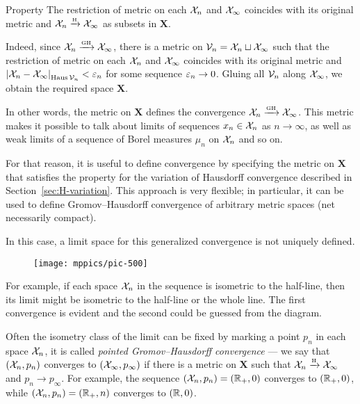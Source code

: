 \begin{thm}{Property}\label{propery:GH}
The restriction of metric on each $\mathcal{X}_n$ and $\mathcal{X}_\infty$ coincides with its original metric 
and $\mathcal{X}_n\xrightarrow{\mbox{\tiny\rm H}} \mathcal{X}_\infty$ as subsets in $\bm{X}$.
\end{thm}


Indeed, since $\mathcal{X}_n\xrightarrow{\mbox{\tiny\rm GH}} \mathcal{X}_\infty$, there is a metric on $\mathcal{V}_n=\mathcal{X}_n\sqcup \mathcal{X}_\infty$ such that the restriction of metric on each $\mathcal{X}_n$ and $\mathcal{X}_\infty$ coincides with its original metric and $\dist{\spc{X}_n}{\spc{X}_\infty}{\Haus\spc{V}_n}<\eps_n$ for some sequence $\varepsilon_n\to 0$.
Gluing all $\mathcal{V}_n$ along $\mathcal{X}_\infty$, we obtain the required space $\bm{X}$.

In other words, the metric on $\bm{X}$ defines the convergence $\spc{X}_n\z\GHto \spc{X}_\infty$.
This metric makes it possible to talk about limits of sequences $x_n\in \mathcal{X}_n$ as $n\to\infty$, as well as weak limits of a sequence of Borel measures $\mu_n$ on $\mathcal{X}_n$ and so on.

For that reason, it is useful to define convergence by specifying the metric on $\bm{X}$ that satisfies the property
for the variation of Hausdorff convergence described in Section~\ref{sec:H-variation}.
This approach is very flexible;
in particular, it can be used to define Gromov--Hausdorff convergence of arbitrary metric spaces (net necessarily compact).

In this case, a limit space for this generalized convergence is not uniquely defined.
\begin{figure}[h!]
\vskip-0mm
\centering
\texttt{[image: mppics/pic-500]}
\end{figure}
For example, if each space $\mathcal{X}_n$ in the sequence is isometric to the half-line, then its limit might be isometric to the half-line or the whole line.
The first convergence is evident and the second could be guessed from the diagram.



Often the isometry class of the limit can be fixed by marking a point $p_n$ in each space $\mathcal{X}_n$, it is called \emph{pointed Gromov--Hausdorff convergence} --- we say that $(\mathcal{X}_n,p_n)$ converges to $(\mathcal{X}_\infty,p_\infty)$ if there is a metric on $\bm{X}$ such that $\mathcal{X}_n\xrightarrow{\mbox{\tiny\rm H}} \mathcal{X}_\infty$ and $p_n\to p_\infty$.
For example, the sequence $(\mathcal{X}_n,p_n)=(\mathbb{R}_+,0)$ converges to $(\mathbb{R}_+,0)$, while $(\mathcal{X}_n,p_n)=(\mathbb{R}_+,n)$ converges to $(\mathbb{R},0)$.

